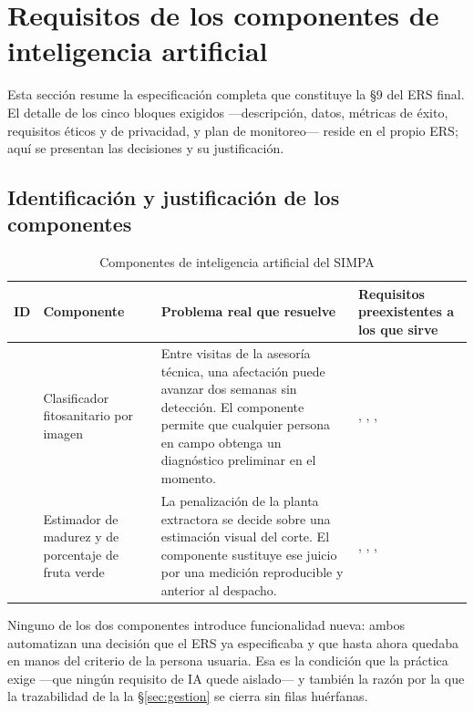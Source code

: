 \section{Requisitos de los componentes de inteligencia artificial}
\label{sec:ia}

Esta sección resume la especificación completa que constituye la \S9 del ERS final. El detalle de los
cinco bloques exigidos ---descripción, datos, métricas de éxito, requisitos éticos y de privacidad, y
plan de monitoreo--- reside en el propio ERS; aquí se presentan las decisiones y su justificación.

\subsection{Identificación y justificación de los componentes}

\begin{table}[H]
\centering\footnotesize
\caption{Componentes de inteligencia artificial del SIMPA}
\label{tab:comp-ia-inf}
\begin{tabular}{|C{1.5cm}|L{4.2cm}|L{4.6cm}|L{4.6cm}|}
\hline
{}\textbf{ID} & \textbf{Componente} & \textbf{Problema real que resuelve} & \textbf{Requisitos preexistentes a los que sirve}\\ \hline
{} & Clasificador fitosanitario por imagen & Entre visitas de la asesoría técnica, una afectación puede avanzar dos semanas sin detección. El componente permite que cualquier persona en campo obtenga un diagnóstico preliminar en el momento. & , , , \\ \hline
{} & Estimador de madurez y de porcentaje de fruta verde & La penalización de la planta extractora se decide sobre una estimación visual del corte. El componente sustituye ese juicio por una medición reproducible y anterior al despacho. & , , , \\ \hline
\end{tabular}
\end{table}

\noindent
Ninguno de los dos componentes introduce funcionalidad nueva: ambos automatizan una decisión que el
ERS ya especificaba y que hasta ahora quedaba en manos del criterio de la persona usuaria. Esa es la
condición que la práctica exige ---que ningún requisito de IA quede aislado--- y también la razón por
la que la trazabilidad de la la \S\ref{sec:gestion} se cierra sin filas huérfanas.

